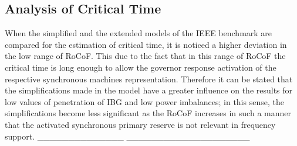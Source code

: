 
\subsection{Analysis of Critical Time}


When the simplified and the extended models of the IEEE benchmark are compared for the estimation of critical time, it is noticed a higher deviation in the low range of RoCoF. This due to the fact that in this range of RoCoF the critical time is long enough to allow the governor response activation of the respective synchronous machines representation. Therefore it can be stated that the simplifications made in the model have a greater influence on the results for low values of penetration of IBG and low power imbalances; in this sense, the simplifications become less significant as the RoCoF increases in such a manner that the activated synchronous primary reserve is not relevant in frequency support.
______________
____________________


